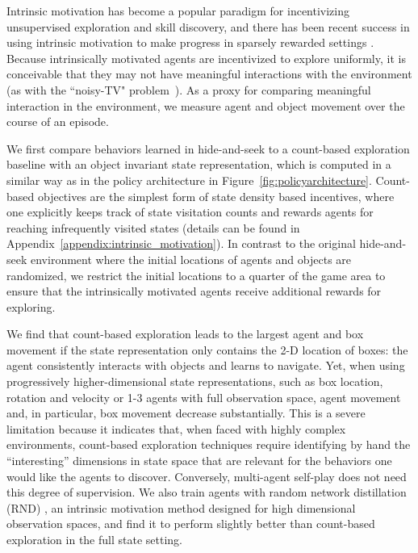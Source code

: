 \label{sec:compare_intrinsic_motivation}

Intrinsic motivation has become a popular paradigm for incentivizing unsupervised exploration and skill discovery, and there has been recent success in using intrinsic motivation to make progress in sparsely rewarded settings \citep{bellemare2016unifying, burda2018exploration}.
Because intrinsically motivated agents are incentivized to explore uniformly, it is conceivable that they may not have meaningful interactions with the environment (as with the ``noisy-TV" problem~\citep{burda2018large}). As a proxy for comparing meaningful interaction in the environment, we measure agent and object movement over the course of an episode.

We first compare behaviors learned in hide-and-seek to a count-based exploration baseline \citep{strehl2008analysis} with an object invariant state representation, which is computed in a similar way as in the policy architecture in Figure~\ref{fig:policyarchitecture}. Count-based objectives are the simplest form of state density based incentives, where one explicitly keeps track of state visitation counts and rewards agents for reaching infrequently visited states (details can be found in Appendix~\ref{appendix:intrinsic_motivation}). In contrast to the original hide-and-seek environment where the initial locations of agents and objects are randomized, we restrict the initial locations to a quarter of the game area to ensure that the intrinsically motivated agents receive additional rewards for exploring.

We find that count-based exploration leads to the largest agent and box movement if the state representation only contains the 2-D location of boxes: the agent consistently interacts with objects and learns to navigate. Yet, when using progressively higher-dimensional state representations, such as box location, rotation and velocity or 1-3 agents with full observation space, agent movement and, in particular, box movement decrease substantially. This is a severe limitation because it indicates that, when faced with highly complex environments, count-based exploration techniques require identifying by hand the ``interesting'' dimensions in state space that are relevant for the behaviors one would like the agents to discover. Conversely, multi-agent self-play does not need this degree of supervision. We also train agents with random network distillation (RND) \citep{burda2018exploration}, an intrinsic motivation method designed for high dimensional observation spaces, and find it to perform slightly better than count-based exploration in the full state setting. 

